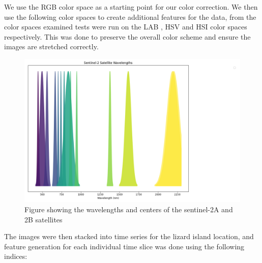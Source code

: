 \documentclass[journal,article,submit,pdftex,moreauthors]{Definitions/mdpi}
\begin{document}
We use the RGB color space as a starting point for our color correction. We then use the following color spaces to create additional features for the data, from the color spaces examined tests were run on the LAB \cite{wyszecki2000color}, HSV and HSI \cite{gonzalezr2006digital} 
color spaces respectively. This was done to preserve the overall color scheme and ensure the images are stretched correctly.  
\begin{figure}
	\centering
	\includegraphics[width=0.7\linewidth]{Images/Sentinel-2 Wavelengths.png}
	\caption{Figure showing the wavelengths and centers of the sentinel-2A and 2B satellites}
	\label{fig:wavelengths_sen2}
\end{figure}
The images were then stacked into time series for the lizard island location, and feature generation for each individual time slice was done using the following indices:
\end{document}

